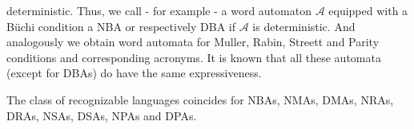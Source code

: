 deterministic. Thus, we call - for example - a word automaton $\mathcal{A}$
equipped with a Büchi condition a \ac{NBA} or respectively \ac{DBA} if
$\mathcal{A}$ is deterministic. And analogously we obtain word automata for
Muller, Rabin, Streett and Parity conditions and corresponding acronyms.
It is known that all these automata (except for \acp{DBA}) do have the same
expressiveness.
\begin{theorem}
  \cite[Proposition 5.3, Theorem 5.4, Proposition 5.6]{LangAutoLog}
  The class of recognizable languages coincides for \acp{NBA}, \acp{NMA},
  \acp{DMA}, \acp{NRA}, \acp{DRA}, \acp{NSA}, \acp{DSA}, \acp{NPA} and
  \acp{DPA}.
\end{theorem}

